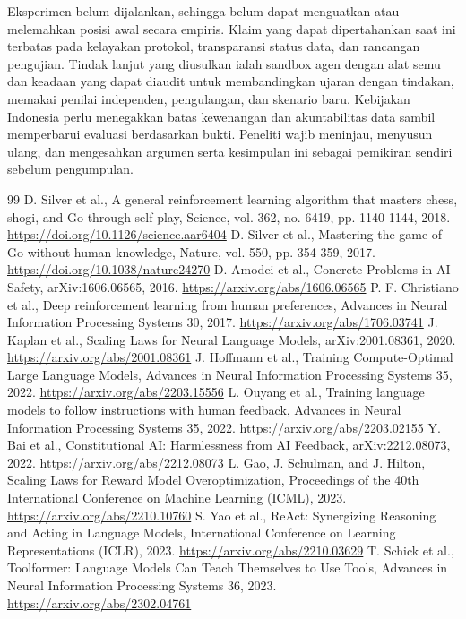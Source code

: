 \documentclass[conference,a4paper]{IEEEtran}
\begin{document}
Eksperimen belum dijalankan, sehingga belum dapat menguatkan atau melemahkan posisi awal secara empiris. Klaim yang dapat dipertahankan saat ini terbatas pada kelayakan protokol, transparansi status data, dan rancangan pengujian. Tindak lanjut yang diusulkan ialah sandbox agen dengan alat semu dan keadaan yang dapat diaudit untuk membandingkan ujaran dengan tindakan, memakai penilai independen, pengulangan, dan skenario baru. Kebijakan Indonesia perlu menegakkan batas kewenangan dan akuntabilitas data sambil memperbarui evaluasi berdasarkan bukti. Peneliti wajib meninjau, menyusun ulang, dan mengesahkan argumen serta kesimpulan ini sebagai pemikiran sendiri sebelum pengumpulan.

\begin{thebibliography}{99}
 D. Silver et al., A general reinforcement learning algorithm that masters chess, shogi, and Go through self-play, Science, vol. 362, no. 6419, pp. 1140-1144, 2018. \url{https://doi.org/10.1126/science.aar6404}
 D. Silver et al., Mastering the game of Go without human knowledge, Nature, vol. 550, pp. 354-359, 2017. \url{https://doi.org/10.1038/nature24270}
 D. Amodei et al., Concrete Problems in AI Safety, arXiv:1606.06565, 2016. \url{https://arxiv.org/abs/1606.06565}
 P. F. Christiano et al., Deep reinforcement learning from human preferences, Advances in Neural Information Processing Systems 30, 2017. \url{https://arxiv.org/abs/1706.03741}
 J. Kaplan et al., Scaling Laws for Neural Language Models, arXiv:2001.08361, 2020. \url{https://arxiv.org/abs/2001.08361}
 J. Hoffmann et al., Training Compute-Optimal Large Language Models, Advances in Neural Information Processing Systems 35, 2022. \url{https://arxiv.org/abs/2203.15556}
 L. Ouyang et al., Training language models to follow instructions with human feedback, Advances in Neural Information Processing Systems 35, 2022. \url{https://arxiv.org/abs/2203.02155}
 Y. Bai et al., Constitutional AI: Harmlessness from AI Feedback, arXiv:2212.08073, 2022. \url{https://arxiv.org/abs/2212.08073}
 L. Gao, J. Schulman, and J. Hilton, Scaling Laws for Reward Model Overoptimization, Proceedings of the 40th International Conference on Machine Learning (ICML), 2023. \url{https://arxiv.org/abs/2210.10760}
 S. Yao et al., ReAct: Synergizing Reasoning and Acting in Language Models, International Conference on Learning Representations (ICLR), 2023. \url{https://arxiv.org/abs/2210.03629}
 T. Schick et al., Toolformer: Language Models Can Teach Themselves to Use Tools, Advances in Neural Information Processing Systems 36, 2023. \url{https://arxiv.org/abs/2302.04761}

\end{thebibliography}
\end{document}
